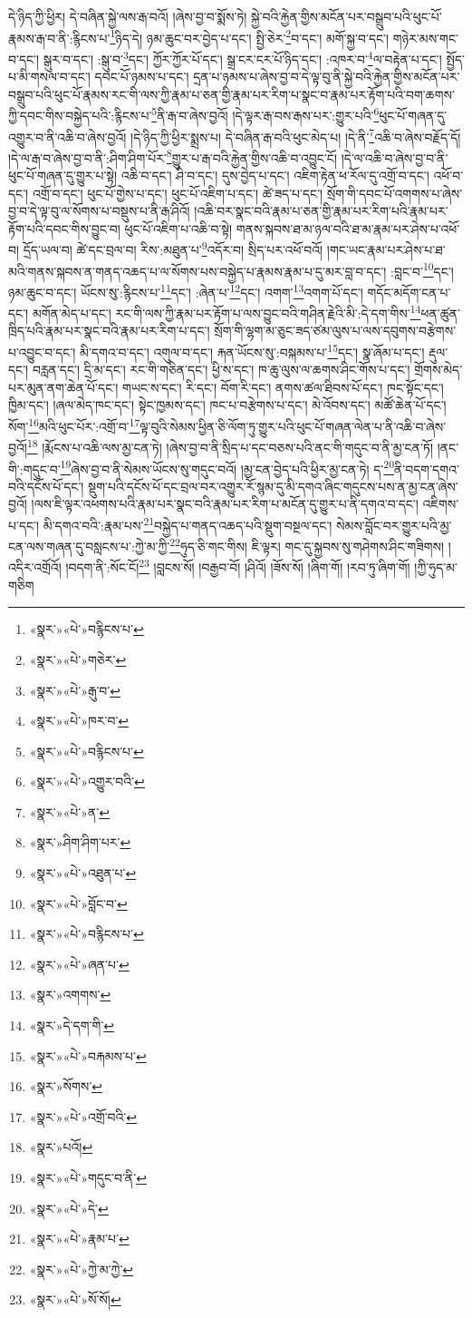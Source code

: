 དེ་ཉིད་ཀྱི་ཕྱིར། དེ་བཞིན་སྐྱེ་ལས་རྒ་བའོ། །ཞེས་བྱ་བ་སྨོས་ཏེ། སྐྱེ་བའི་རྐྱེན་གྱིས་མངོན་པར་བསྒྲུབ་པའི་ཕུང་པོ་རྣམས་རྒ་བ་ནི་:རྙིངས་པ་\footnote{«སྣར་»«པེ་»བརྙིངས་པ་}ཉིད་དེ། ཉམ་ཆུང་བར་བྱེད་པ་དང་། སྤྱི་ཅེར་\footnote{«སྣར་»«པེ་»གཅེར་}བ་དང་། མགོ་སྐྱ་བ་དང་། གཉེར་མས་གང་བ་དང་། སྒུར་བ་དང་། :སྒུ་བ་\footnote{«སྣར་»«པེ་»རྒུ་བ་}དང་། ཀྱོར་ཀྱོར་པོ་དང་། སྒྲ་ངར་ངར་པོ་ཉིད་དང་། :འཁར་བ་\footnote{«སྣར་»«པེ་»ཁར་བ་}ལ་བརྟེན་པ་དང་། སྤྱོད་པ་མི་གསལ་བ་དང་། དབང་པོ་ཉམས་པ་དང་། དྲན་པ་ཉམས་པ་ཞེས་བྱ་བ་དེ་ལྟ་བུ་ནི་སྐྱེ་བའི་རྐྱེན་གྱིས་མངོན་པར་བསྒྲུབ་པའི་ཕུང་པོ་རྣམས་རང་གི་ལས་ཀྱི་རྣམ་པ་ཅན་གྱི་རྣམ་པར་རིག་པ་སྣང་བ་རྣམ་པར་རྟོག་པའི་བག་ཆགས་ཀྱི་དབང་གིས་བསྐྱེད་པའི་:རྙིངས་པ་\footnote{«སྣར་»«པེ་»བརྙིངས་པ་}ནི་རྒ་བ་ཞེས་བྱའོ། །དེ་ལྟར་རྒ་བས་རྒས་པར་:གྱུར་པའི་\footnote{«སྣར་»«པེ་»འགྱུར་བའི་}ཕུང་པོ་གཞན་དུ་འགྱུར་བ་ནི་འཆི་བ་ཞེས་བྱའོ། །དེ་ཉིད་ཀྱི་ཕྱིར་སྨྲས་པ། དེ་བཞིན་རྒ་བའི་ཕུང་མེད་པ། །དེ་ནི་\footnote{«སྣར་»«པེ་»ན་}འཆི་བ་ཞེས་བརྗོད་དོ། །དེ་ལ་རྒ་བ་ཞེས་བྱ་བ་ནི་:ཤིག་ཤིག་པོར་\footnote{«སྣར་»ཤིག་ཤིག་པར་}གྱུར་པ་རྒ་བའི་རྐྱེན་གྱིས་འཆི་བ་འབྱུང་ངོ། །དེ་ལ་འཆི་བ་ཞེས་བྱ་བ་ནི་ཕུང་པོ་གཞན་དུ་གྱུར་པ་སྟེ། འཆི་བ་དང་། ཤི་བ་དང་། དུས་བྱེད་པ་དང་། འཇིག་རྟེན་ཕ་རོལ་དུ་འགྲོ་བ་དང་། འཕོ་བ་དང་། འགྲོ་བ་དང་། ཕུང་པོ་གྱེས་པ་དང་། ཕུང་པོ་འཇིག་པ་དང་། ཚེ་ཟད་པ་དང་། སྲོག་གི་དབང་པོ་འགགས་པ་ཞེས་བྱ་བ་དེ་ལྟ་བུ་ལ་སོགས་པ་བསྡུས་པ་ནི་རྒ་ཤིའོ། །འཆི་བར་སྣང་བའི་རྣམ་པ་ཅན་གྱི་རྣམ་པར་རིག་པའི་རྣམ་པར་རྟོག་པའི་དབང་གིས་བྱུང་བ། ཕུང་པོ་འཇིག་པ་འཆི་བ་སྟེ། གནས་སྐབས་ཐ་མ་ཉལ་བའི་ཐ་མ་རྣམ་པར་ཤེས་པ་འཕོ་བ། དྲོད་ཡལ་བ། ཚེ་དང་བྲལ་བ། རིས་:མཐུན་པ་\footnote{«སྣར་»«པེ་»འཐུན་པ་}འདོར་བ། སྲིད་པར་འཕོ་བའོ། །གང་ཡང་རྣམ་པར་ཤེས་པ་ཐ་མའི་གནས་སྐབས་ན་གནད་འཆད་པ་ལ་སོགས་པས་བསྐྱེད་པ་རྣམས་རྣམ་པ་དུ་མར་བླ་བ་དང་། :བླང་བ་\footnote{«སྣར་»«པེ་»བློང་བ་}དང་། ཉམ་ཆུང་བ་དང་། ཡོངས་སུ་:རྙིངས་པ་\footnote{«སྣར་»«པེ་»བརྙིངས་པ་}དང་། :ཞེན་པ་\footnote{«སྣར་»«པེ་»ཞན་པ་}དང་། འགག་\footnote{«སྣར་»འགགས་}འགག་པོ་དང་། གདོང་མདོག་ངན་པ་དང་། མགོན་མེད་པ་དང་། རང་གི་ལས་ཀྱི་རྣམ་པར་རྟོག་པ་ལས་བྱུང་བའི་གཤིན་རྗེའི་མི་:དེ་དག་གིས་\footnote{«སྣར་»དེ་དག་གི་}ཕན་ཚུན་ཁྲིད་པའི་རྣམ་པར་སྣང་བའི་རྣམ་པར་རིག་པ་དང་། སྲོག་གི་ལྷག་མ་ཅུང་ཟད་ཙམ་ལུས་པ་ལས་དབུགས་བརྩེགས་པ་འབྱུང་བ་དང་། མི་དགའ་བ་དང་། འགུལ་བ་དང་། རྐན་ཡོངས་སུ་:བསྐམས་པ་\footnote{«སྣར་»«པེ་»བརྐམས་པ་}དང་། སྣ་ཞོམ་པ་དང་། རྡུལ་དང་། བརླན་དང་། དྲི་མ་དང་། རང་གི་གཅིན་དང་། ཕྱི་ས་དང་། ཁ་ཆུ་ལུས་ལ་ཆགས་ཤིང་གོས་པ་དང་། གྲོགས་མེད་པར་མུན་ནག་ཆེན་པོ་དང་། གཡང་ས་དང་། རི་དང་། བོག་རི་དང་། ནགས་ཚལ་ཐིབས་པོ་དང་། ཁང་སྟོང་དང་། ཁྱིམ་དང་། །ཞལ་མེད་ཁང་དང་། སྟེང་ཁྱམས་དང་། ཁང་པ་བརྩེགས་པ་དང་། མེ་འོབས་དང་། མཚོ་ཆེན་པོ་དང་། སོག་\footnote{«སྣར་»སོགས་}མའི་ཕུང་པོར་:འགྲོ་བ་\footnote{«སྣར་»«པེ་»འགྲོ་བའི་}ལྟ་བུའི་སེམས་ཕྱིན་ཅི་ལོག་ཏུ་གྱུར་པའི་ཕུང་པོ་གཞན་ལེན་པ་ནི་འཆི་བ་ཞེས་བྱའོ།\footnote{«སྣར་»པའོ།} །རྨོངས་པ་འཆི་ལས་མྱ་ངན་ཏེ། །ཞེས་བྱ་བ་ནི་སྲིད་པ་དང་བཅས་པའི་ནང་གི་གདུང་བ་ནི་མྱ་ངན་ཏོ། །ནང་གི་:གདུང་བ་\footnote{«སྣར་»«པེ་»གདུང་བ་ནི་}ཞེས་བྱ་བ་ནི་སེམས་ཡོངས་སུ་གདུང་བའོ། །མྱ་ངན་བྱེད་པའི་ཕྱིར་མྱ་ངན་ཏེ། ད་\footnote{«སྣར་»«པེ་»དེ་}ནི་བདག་དགའ་བའི་དངོས་པོ་དང་། སྡུག་པའི་དངོས་པོ་དང་བྲལ་བར་འགྱུར་རོ་སྙམ་དུ་མི་དགའ་ཞིང་གདུངས་པས་ན་མྱ་ངན་ཞེས་བྱའོ། །ལས་ཇི་ལྟར་འཕགས་པའི་རྣམ་པར་སྣང་བའི་རྣམ་པར་རིག་པ་མངོན་དུ་གྱུར་པ་ནི་དགའ་བ་དང་། འཇིགས་པ་དང་། མི་དགའ་བའི་:རྣམ་པས་\footnote{«སྣར་»«པེ་»རྣམ་པ་}བསྐྱེད་པ་གནད་འཆད་པའི་སྡུག་བསྔལ་དང་། སེམས་བློང་བར་གྱུར་པའི་མྱ་ངན་ལས་གཞན་དུ་བསླངས་པ་:ཀྱེ་མ་ཀྱི་\footnote{«སྣར་»«པེ་»ཀྱེ་མ་ཀྱེ་}ཧུད་ཅི་གང་གིས། ཇི་ལྟར། གང་དུ་སྐྱབས་སུ་གཤེགས་ཤིང་གཟིགས། །འདིར་འགྲོའོ། །བདག་ནི་:སོང་ངོ།\footnote{«སྣར་»«པེ་»སོ་སོ།} །བླངས་སོ། །བརྒྱབ་བོ། །ཤིའོ། །ཟོས་སོ། །ཞིག་གོ། །རབ་ཏུ་ཞིག་གོ། །ཀྱི་ཧུད་མ་གཅིག 